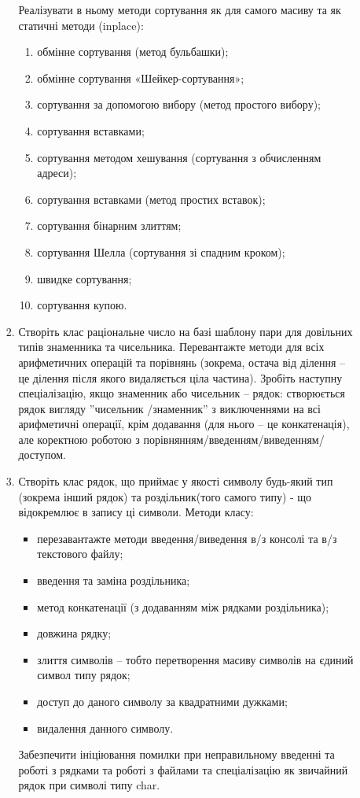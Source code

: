 \documentclass[a5paper,titlepage,openany,twoside,
]
{book_unv}%
\makeatletter
\newcommand{\xslalph}[1]{\expandafter\@xslalph\csname c@#1\endcsname}
\newcommand{\@xslalph}[1]{%
    \ifcase#1\or а\or б\or в\or г\or д\or e\or є\or ж\or з\or i%
    \or й\or к\or л\or м\or н\or о\or п\or р\or с\or т%
    \or у\or ф\or х\or ц\or ч\or ш\or ю\or я\or аа\or бб\or вв%
    \else\@ctrerr\fi%
}
\makeatother
\begin{document}
\begin{enumerate}
\begin{enumerate}
\begin{enumerate}
Реалізувати в ньому методи сортування як для самого масиву та як статичні методи (inplace):
\begin{enumerate}[label=\xslalph*)]
\item
обмінне сортування (метод бульбашки);
\item
обмінне сортування «Шейкер-сортування»;
\item
сортування за допомогою вибору (метод простого вибору);
\item
сортування вставками;
\item
сортування методом хешування (сортування з обчисленням адреси);
\item
сортування вставками (метод простих вставок);
\item
сортування бінарним злиттям;
\item
сортування Шелла (сортування зі спадним кроком);
\item
швидке сортування;
\item
сортування купою.
\end{enumerate}

\item
Створіть клас раціональне число на базі шаблону пари для довільних типів знаменника та чисельника.
Перевантажте методи для всіх арифметичних операцій та порівнянь
(зокрема, остача від ділення -- це ділення після якого видаляється ціла частина).
Зробіть наступну спеціалізацію, якщо знаменник або чисельник -- рядок:
створюється рядок вигляду ''{чисельник} /{знаменник}'' з виключеннями на всі арифметичні операції,
крім додавання (для нього -- це конкатенація), але коректною роботою з
порівнянням/введенням/виведенням/доступом.

\item
Створіть клас рядок, що приймає у якості символу будь-який тип (зокрема інший рядок)
та роздільник(того самого типу) - що відокремлює в запису ці символи.
Методи класу:
\begin{itemize}
\item
перезавантажте методи введення/виведення в/з консолі та в/з текстового файлу;
\item
введення та заміна роздільника;
\item
метод конкатенації (з додаванням між рядками роздільника);
\item
довжина рядку;
\item
злиття символів -- тобто перетворення масиву символів на єдиний символ типу рядок;
\item
доступ до даного символу за квадратними дужками;
\item
видалення данного символу.
\end{itemize}
Забезпечити ініціювання помилки при неправильному введенні та роботі з рядками
та роботі з файлами та спеціалізацію як звичайний рядок при символі типу char.


\end{enumerate}
\end{enumerate}
\end{enumerate}
\end{document}
